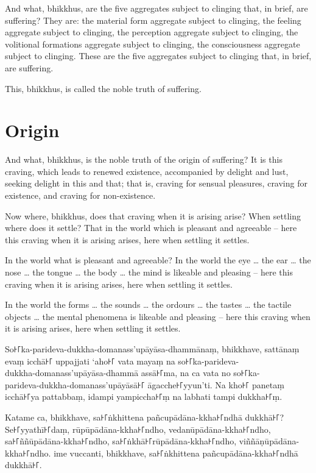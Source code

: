 And what, bhikkhus, are the five aggregates subject to clinging that, in brief,
are suffering? They are: the material form aggregate subject to clinging, the
feeling aggregate subject to clinging, the perception aggregate subject to
clinging, the volitional formations aggregate subject to clinging, the
consciousness aggregate subject to clinging. These are the five aggregates
subject to clinging that, in brief, are suffering.

This, bhikkhus, is called the noble truth of suffering.

\section{Origin}

And what, bhikkhus, is the noble truth of the origin of suffering? It is this
craving, which leads to renewed existence, accompanied by delight and lust,
seeking delight in this and that; that is, craving for sensual pleasures,
craving for existence, and craving for non-existence.

Now where, bhikkhus, does that craving when it is arising arise? When settling
where does it settle? That in the world which is pleasant and agreeable -- here
this craving when it is arising arises, here when settling it settles.

In the world what is pleasant and agreeable? In the world the eye \ldots{} the
ear \ldots{} the nose \ldots{} the tongue \ldots{} the body \ldots{} the mind is
likeable and pleasing -- here this craving when it is arising arises, here when
settling it settles.

In the world the forms \ldots{} the sounds \ldots{} the ordours \ldots{} the
tastes \ldots{} the tactile objects \ldots{} the mental phenomena is likeable
and pleasing -- here this craving when it is arising arises, here when settling
it settles.

\paliPage

So꜔꜒ka-parideva-dukkha-domanass'upāyāsa-dhammānaṃ, bhikkhave, sattānaṃ evaṃ icchā꜔꜒
uppajjati ‘aho꜔꜒ vata mayaṃ na so꜔꜒ka-parideva-\\
dukkha-domanass'upāyāsa-dhammā assā꜔꜒ma, na ca vata no so꜔꜒ka-\\
parideva-dukkha-domanass'upāyāsā꜔꜒ āgacche꜔꜒yyun’ti. Na kho꜔꜒ panetaṃ icchā꜔꜒ya
pattabbaṃ, idampi yampiccha꜔꜒ṃ na labhati tampi dukkha꜔꜒ṃ.

Katame ca, bhikkhave, sa꜔꜒ṅkhittena pañcupādāna-kkha꜔꜒ndhā dukkhā꜔꜒? Se꜔꜒yyathī꜔꜒daṃ,
rūpūpādāna-kkha꜔꜒ndho, vedanūpādāna-kkha꜔꜒ndho, sa꜔꜒ññūpādāna-kkha꜔꜒ndho,
sa꜔꜒ṅkhā꜔꜒rūpādāna-kkha꜔꜒ndho, viññāṇūpādāna-kkha꜔꜒ndho. ime vuccanti, bhikkhave,
sa꜔꜒ṅkhittena pañcupādāna-kkha꜔꜒ndhā dukkhā꜔꜒.

